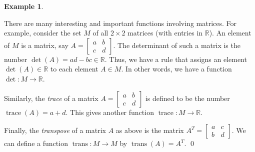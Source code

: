 \documentclass[a4paper]{book}
\newcommand{\PURPLE}[1]{{\color{purple}#1}}
\newcommand{\R}         {{\mathbb{R}}}
\newcommand{\bsm}       {\left[\begin{smallmatrix}}
\newcommand{\esm}       {\end{smallmatrix}\right]}
\newcommand{\tm}        {\times}
\newcommand{\xra}       {\xrightarrow}
\newcommand{\trans}     {\operatorname{trans}}
\newcommand{\trc}       {\operatorname{trace}}
\renewcommand{\:}{\colon}
\newcommand{\bilabel}[1]{\hypertarget{#1}{\label{#1}}}
\newcommand{\DEFN}[1]{\PURPLE{\emph{#1}}}
\theoremstyle{definition}
\newtheorem{example}[theorem]{Example}
\begin{document}
\begin{example}\bilabel{eg-mat-fun}
 There are many interesting and important functions involving
 matrices.  For example, consider the set $M$ of all $2\tm 2$
 matrices (with entries in $\R$).  An element of $M$ is a matrix, say
 $A=\bsm a&b\\c&d\esm$.  The determinant of such a matrix is the
 number $\det(A)=ad-bc\in\R$.  Thus, we have a rule that assigns an
 element $\det(A)\in\R$ to each element $A\in M$.  In other words, we
 have a function $\det\:M\xra{}\R$.
 
 Similarly, the \DEFN{trace} of a matrix $A=\bsm a&b\\c&d\esm$ is
 defined to be the number $\trc(A)=a+d$.  This gives another function
 $\trc\:M\xra{}\R$.

 Finally, the \DEFN{transpose} of a matrix $A$ as above is the matrix
 $A^T=\bsm a&c\\b&d\esm$.  We can define a function $\trans\:M\xra{}M$
 by $\trans(A)=A^T$. \qed
\end{example}
\end{document}
